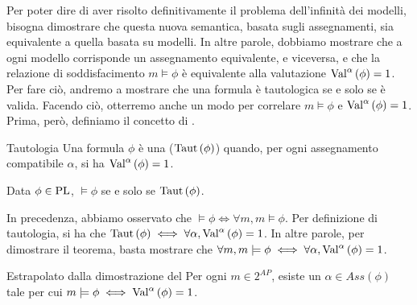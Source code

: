 Per poter dire di aver risolto definitivamente il problema dell'infinità dei modelli, bisogna dimostrare che questa nuova semantica, basata sugli assegnamenti, sia equivalente a quella basata su modelli. 
In altre parole, dobbiamo mostrare che a ogni modello corrisponde un assegnamento equivalente, e viceversa, e che la relazione di soddisfacimento \(m \models \phi\) è equivalente alla valutazione \(\Val{\alpha}[\phi] = 1\).
Per fare ciò, andremo a mostrare che una formula è tautologica se e solo se è valida. 
Facendo ciò, otterremo anche un modo per correlare \(m \models \phi\) e \(\Val{\alpha}[\phi] = 1\).
Prima, però, definiamo il concetto di .

\begin{definition}{Tautologia}
  Una formula \(\phi\) è una  (\(\Taut[\phi]\)) quando, per ogni assegnamento compatibile \(\alpha\), si ha \(\Val{\alpha}[\phi]=1\).
\end{definition}

\begin{theorem}[label=thm:validity-equals-taut]{}
  Data \(\phi \in \operatorname{PL}\), \(\models \phi \) se e solo se \(\Taut[\phi]\).
\end{theorem}

In precedenza, abbiamo osservato che \(\models \phi \iff \forall m, m \models \phi\).
Per definizione di tautologia, si ha che
\(\Taut[\phi]\iff\forall \alpha ,\Val{\alpha}[\phi] = 1\).
In altre parole, per dimostrare il teorema, basta mostrare che \(\forall m, m \models \phi \iff \forall \alpha, \Val{\alpha}[\phi] =1\).

\begin{lemma}[listtitle={Estrapolato dalla dimostrazione del \Cref{thm:validity-equals-taut}}]{\infosymbol{} Estrapolato dalla dimostrazione del }
  Per ogni \(m \in 2^{AP}\), esiste un \(\alpha \in Ass(\phi)\) tale per cui \(m \models \phi \iff \Val{\alpha}[\phi]=1\).
\end{lemma}

